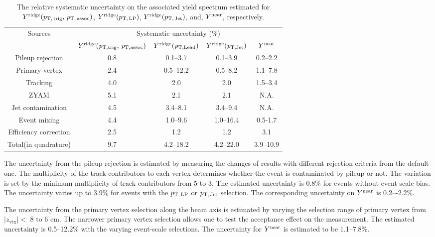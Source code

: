 \begin{table}[h!]
\caption{The relative systematic uncertainty on the associated yield spectrum estimated for $Y^{\rm{ridge}}(p_\mathrm{T,\,trig},\,p_\mathrm{T,\,assoc})$, $Y^{\rm{ridge}}(p_\mathrm{T,\,LP})$, $Y^{\rm{ridge}}(p_\mathrm{T,\,Jet})$, and, $Y^{\rm{near}}$, respectively.}
\centering
\begin{tabular}{|c|c|c|c|c|}
\hline 
\multirow{2}{*}{Sources}  & \multicolumn{4}{c|}{Systematic uncertainty (\%)} \\\cline{2-5} 
         & $Y^{\rm{ridge}}(\it{p}_{\rm{T, trig}},\,\it{p}_{\rm{T, assoc}})$ & $Y^{\rm{ridge}}(\it{p}_{\rm{T, Lead}})$ & $Y^{\rm{ridge}}(\it{p}_{\rm{T, Jet}})$ & $Y^{\rm{near}}$ \\ \hline \hline
Pileup rejection		& 0.8	&0.1--3.7		&0.1--3.9	&0.2--2.2	\\ \hline
Primary vertex		& 2.4	&0.5--12.2	&0.5--8.2	&1.1--7.8	\\ \hline

Tracking			& 4.0 	&2.0		&2.0	&1.5--3.4	\\ \hline

ZYAM			& 5.1	&2.1		&2.1	&N.A.	\\ \hline
Jet contamination	& 4.5	&3.4--8.1		&3.4--9.4	&N.A.	\\ \hline

Event mixing			& 4.4	&1.0--9.6		&1.0--16.4	&0.5-1.7	\\ \hline

Efficiency correction	& 2.5 	&1.2		&1.2	&3.1	\\ \hline \hline
Total(in quadrature)			& 9.7	&4.2--18.2	&4.2--22.0	&3.9--10.9 \\ 
\hline 
\end{tabular}
\label{tab:syst}
\end{table}

The uncertainty from the pileup rejection is estimated by measuring the changes of results with different rejection criteria from the default one. The multiplicity of the track contributors to each vertex determines whether the event is contaminated by pileup or not. The variation is set by the minimum multiplicity of track contributors from 5 to 3. The estimated uncertainty is 0.8\% for events without event-scale bias. The uncertainty varies up to 3.9\% for events with the $p_\mathrm{T,\,LP}$ or $p_\mathrm{T,\,Jet}$ selection. The corresponding uncertainty on $Y^{\rm{near}}$ is 0.2–-2.2\%.

The uncertainty from the primary vertex selection along the beam axis is estimated by varying the selection range of primary vertex from $|z_\mathrm{vtx}|<$ 8 to 6 cm. The narrower primary vertex selection allows one to test the acceptance effect on the measurement. The estimated uncertainty is 0.5--12.2\% with the varying event-scale selections. The uncertainty for $Y^{\rm{near}}$ is estimated to be 1.1--7.8\%.

